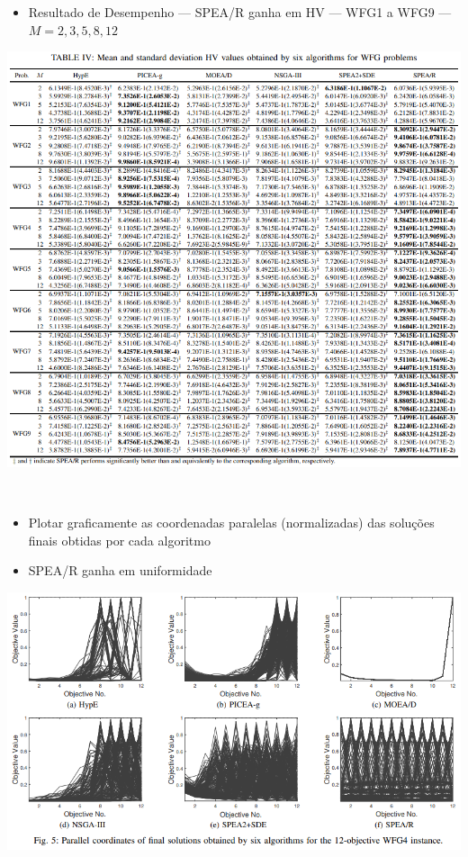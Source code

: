 \documentclass{rbfin}
\begin{document}
\newpage

\begin{itemize}
  \item Resultado de Desempenho --- SPEA/R ganha em HV --- WFG1 a WFG9 --- $M = 2,3,5,8,12$
\end{itemize}

\begin{center}
\includegraphics[scale=0.85]{table4}
\end{center}

\newpage

$\,$

\vspace{20mm}

\begin{itemize}
  \item Plotar graficamente as coordenadas paralelas (normalizadas) das soluções finais obtidas por cada algoritmo
  \item SPEA/R ganha em uniformidade
\end{itemize}

\begin{center}
\includegraphics[scale=1]{fig5}
\end{center}
\end{document}
